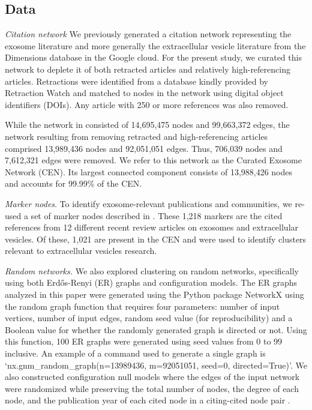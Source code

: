 \documentclass[12pt, oneside]{article}   	%
\begin{document}
	



\subsection{Data} 


\emph{Citation network} We previously generated a citation network \citep{Wedell2022} representing the exosome literature and more generally the extracellular vesicle literature \citep{harding1983,raposo2021} from the Dimensions database \citep{hook2018dimensions} in the Google cloud. For the present study, we curated this network to deplete it of both retracted articles and relatively high-referencing articles. Retractions were identified from a database kindly provided by Retraction Watch \citep{rw2022} and matched to nodes in the network using digital object identifiers (DOIs). Any article with 250 or more references was also removed. 

While the network in \cite{Wedell2022} consisted of 14,695,475 nodes and 99,663,372 edges, the network resulting from removing retracted and high-referencing articles comprised 13,989,436 nodes and 92,051,051 edges. Thus, 706,039 nodes and 7,612,321 edges were removed. We refer to this network as the Curated Exosome Network (CEN). Its largest connected component consists of 13,988,426 nodes and accounts for 99.99\% of the CEN.
	
\emph{Marker nodes}. To identify exosome-relevant publications and communities, we re-used a set of marker nodes described in  \cite{Wedell2022}. These 1,218 markers are the cited references from 12 different recent review articles on exosomes and extracellular vesicles. Of these, 1,021 are present in the CEN and  were used to identify clusters relevant to extracellular vesicles research.


\emph{Random networks.}
We also explored clustering on random networks, specifically using both Erd\H{o}s-Renyi (ER) graphs and configuration models.  The
ER graphs  analyzed in this paper were generated using the Python package NetworkX \citep{hagberg2008} using the random graph function that requires four parameters: number of input vertices, number of input edges, random seed value (for reproducibility) and a Boolean value for whether the randomly generated graph is directed or not. Using this function, 100 ER graphs were generated using seed values from 0 to 99 inclusive. An example of a command used to generate a single graph is  `nx.gnm\_random\_graph(n=13989436, m=92051051, seed=0, directed=True)'. 
We also constructed configuration null models where the edges of the input network were randomized while preserving the total number of nodes, the degree of each node,  and the publication year of each cited node in a citing-cited node pair \citep{bradley2020}. 
 
\end{document}
